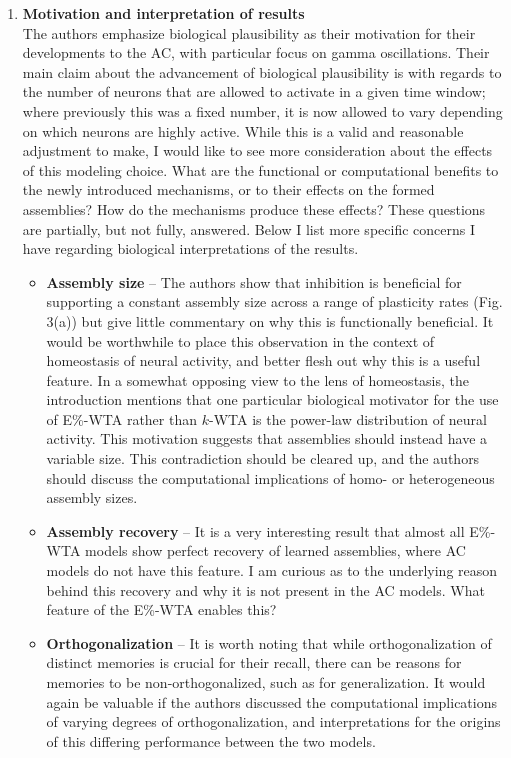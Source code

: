 \documentclass[a4paper, 11pt]{article}
\begin{document}
\begin{enumerate}
    \item \textbf{Motivation and interpretation of results}\\
    The authors emphasize biological plausibility as their motivation for their developments to the AC, with particular focus on gamma oscillations. Their main claim about the advancement of biological plausibility is with regards to the number of neurons that are allowed to activate in a given time window; where previously this was a fixed number, it is now allowed to vary depending on which neurons are highly active. While this is a valid and reasonable adjustment to make, I would like to see more consideration about the effects of this modeling choice. What are the functional or computational benefits to the newly introduced mechanisms, or to their effects on the formed assemblies? How do the mechanisms produce these effects? These questions are partially, but not fully, answered. Below I list more specific concerns I have regarding biological interpretations of the results.
    
    \begin{itemize}
        \item \textbf{Assembly size} -- The authors show that inhibition is beneficial for supporting a constant assembly size across a range of plasticity rates (Fig. 3(a)) but give little commentary on why this is functionally beneficial. It would be worthwhile to place this observation in the context of homeostasis of neural activity, and better flesh out why this is a useful feature. In a somewhat opposing view to the lens of homeostasis, the introduction mentions that one particular biological motivator for the use of E\%-WTA rather than $k$-WTA is the power-law distribution of neural activity. This motivation suggests that assemblies should instead have a variable size. This contradiction should be cleared up, and the authors should discuss the computational implications of homo- or heterogeneous assembly sizes.
        
        \item \textbf{Assembly recovery} -- It is a very interesting result that almost all E\%-WTA models show perfect recovery of learned assemblies, where AC models do not have this feature. I am curious as to the underlying reason behind this recovery and why it is not present in the AC models. What feature of the E\%-WTA enables this?
        
        \item \textbf{Orthogonalization} -- It is worth noting that while orthogonalization of distinct memories is crucial for their recall, there can be reasons for memories to be non-orthogonalized, such as for generalization. It would again be valuable if the authors discussed the computational implications of varying degrees of orthogonalization, and interpretations for the origins of this differing performance between the two models.
        

\end{itemize}
\end{enumerate}
\end{document}
